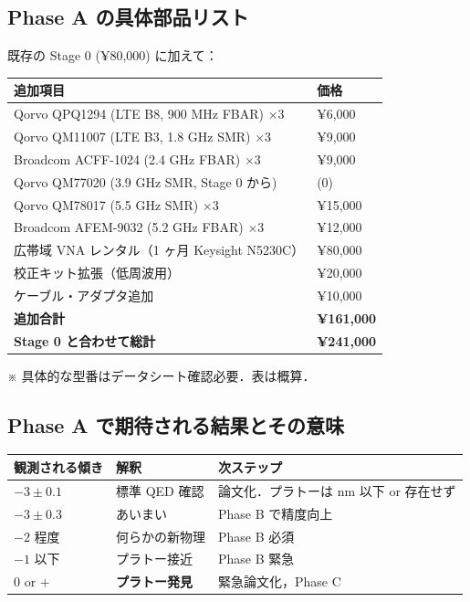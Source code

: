\documentclass[11pt,a4paper]{article}
\begin{document}
\subsection{Phase A の具体部品リスト}

既存の Stage 0 (¥80,000) に加えて：

\begin{center}
\begin{tabular}{ll}
\toprule
追加項目 & 価格 \\
\midrule
Qorvo QPQ1294 (LTE B8, 900 MHz FBAR) $\times 3$ & ¥6,000 \\
Qorvo QM11007 (LTE B3, 1.8 GHz SMR) $\times 3$ & ¥9,000 \\
Broadcom ACFF-1024 (2.4 GHz FBAR) $\times 3$ & ¥9,000 \\
Qorvo QM77020 (3.9 GHz SMR, Stage 0 から) & (0) \\
Qorvo QM78017 (5.5 GHz SMR) $\times 3$ & ¥15,000 \\
Broadcom AFEM-9032 (5.2 GHz FBAR) $\times 3$ & ¥12,000 \\
広帯域 VNA レンタル（1 ヶ月 Keysight N5230C）& ¥80,000 \\
校正キット拡張（低周波用）& ¥20,000 \\
ケーブル・アダプタ追加 & ¥10,000 \\
\midrule
\textbf{追加合計} & \textbf{¥161,000} \\
\textbf{Stage 0 と合わせて総計} & \textbf{¥241,000} \\
\bottomrule
\end{tabular}
\end{center}

※ 具体的な型番はデータシート確認必要．表は概算．

\subsection{Phase A で期待される結果とその意味}

\begin{center}
\begin{tabular}{lll}
\toprule
観測される傾き & 解釈 & 次ステップ \\
\midrule
$-3 \pm 0.1$ & 標準 QED 確認 & 論文化．プラトーは nm 以下 or 存在せず \\
$-3 \pm 0.3$ & あいまい & Phase B で精度向上 \\
$-2$ 程度 & 何らかの新物理 & Phase B 必須 \\
$-1$ 以下 & プラトー接近 & Phase B 緊急 \\
$0$ or $+$ & \textbf{プラトー発見} & 緊急論文化，Phase C \\
\bottomrule
\end{tabular}
\end{center}
\end{document}
